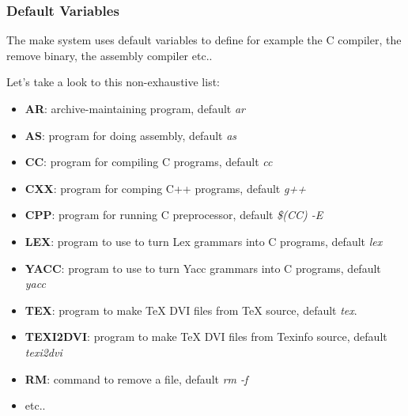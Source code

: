 \begin{frame}
  \frametitle{Default Variables}

  The make system uses default variables to define for example the C compiler,
  the remove binary, the assembly compiler etc..

  \nl

  Let's take a look to this non-exhaustive list:

  \begin{itemize}
    \item
      \textbf{AR}: archive-maintaining program, default \textit{ar}
    \item
      \textbf{AS}: program for doing assembly, default \textit{as}
    \item
      \textbf{CC}: program for compiling C programs, default \textit{cc}
    \item
      \textbf{CXX}: program for comping C++ programs, default \textit{g++}
    \item
      \textbf{CPP}: program for running C preprocessor, default
      \textit{\$(CC) -E}
    \item
      \textbf{LEX}: program to use to turn Lex grammars into C programs,
      default \textit{lex}
    \item
      \textbf{YACC}: program to use to turn Yacc grammars into C programs,
      default \textit{yacc}
    \item
      \textbf{TEX}: program to make TeX DVI files from TeX source, default
      \textit{tex}.
    \item
      \textbf{TEXI2DVI}: program to make TeX DVI files from Texinfo source,
      default \textit{texi2dvi}
    \item
      \textbf{RM}: command to remove a file, default \textit{rm -f}
    \item
      etc..
  \end{itemize}
\end{frame}



